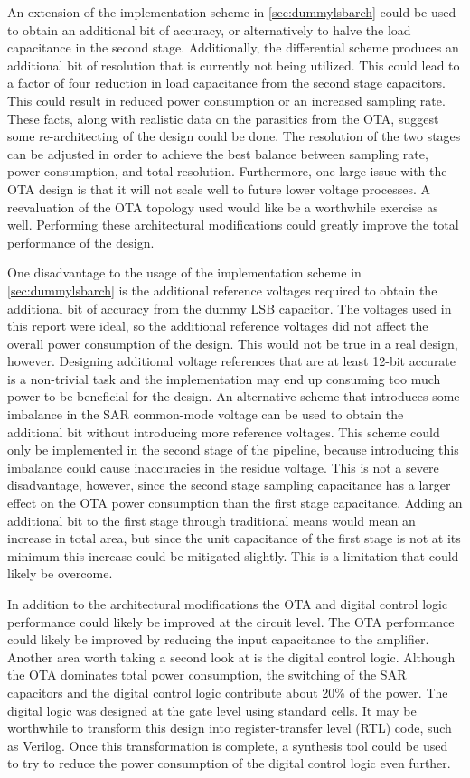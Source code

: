 An extension of the implementation scheme in \ref{sec:dummylsbarch} could be used to obtain an additional bit of accuracy, or alternatively to halve the load capacitance in the second stage. Additionally, the differential scheme produces an additional bit of resolution that is currently not being utilized. This could lead to a factor of four reduction in load capacitance from the second stage capacitors. This could result in reduced power consumption or an increased sampling rate. These facts, along with realistic data on the parasitics from the OTA, suggest some re-architecting of the design could be done. The resolution of the two stages can be adjusted in order to achieve the best balance between sampling rate, power consumption, and total resolution. Furthermore, one large issue with the OTA design is that it will not scale well to future lower voltage processes. A reevaluation of the OTA topology used would like be a worthwhile exercise as well. Performing these architectural modifications could greatly improve the total performance of the design.

One disadvantage to the usage of the implementation scheme in \ref{sec:dummylsbarch} is the additional reference voltages required to obtain the additional bit of accuracy from the dummy LSB capacitor. The voltages used in this report were ideal, so the additional reference voltages did not affect the overall power consumption of the design. This would not be true in a real design, however. Designing additional voltage references that are at least 12-bit accurate is a non-trivial task and the implementation may end up consuming too much power to be beneficial for the design. An alternative scheme that introduces some imbalance in the SAR common-mode voltage can be used to obtain the additional bit without introducing more reference voltages. This scheme could only be implemented in the second stage of the pipeline, because introducing this imbalance could cause inaccuracies in the residue voltage. This is not a severe disadvantage, however, since the second stage sampling capacitance has a larger effect on the OTA power consumption than the first stage capacitance. Adding an additional bit to the first stage through traditional means would mean an increase in total area, but since the unit capacitance of the first stage is not at its minimum this increase could be mitigated slightly. This is a limitation that could likely be overcome. 

In addition to the architectural modifications the OTA and digital control logic performance could likely be improved at the circuit level. The OTA performance could likely be improved by reducing the input capacitance to the amplifier. Another area worth taking a second look at is the digital control logic. Although the OTA dominates total power consumption, the switching of the SAR capacitors and the digital control logic contribute about 20\% of the power. The digital logic was designed at the gate level using standard cells. It may be worthwhile to transform this design into register-transfer level (RTL) code, such as Verilog. Once this transformation is complete, a synthesis tool could be used to try to reduce the power consumption of the digital control logic even further. 

